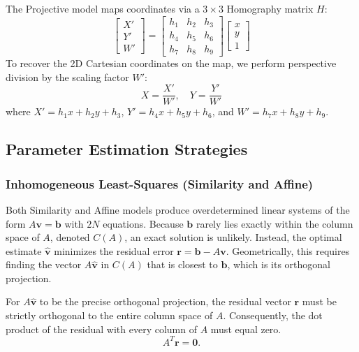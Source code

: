 The Projective model maps coordinates via a $3 \times 3$ Homography matrix $H$:
\begin{equation}
\begin{bmatrix} X' \\ Y' \\ W' \end{bmatrix} =
\begin{bmatrix}
h_1 & h_2 & h_3 \\
h_4 & h_5 & h_6 \\
h_7 & h_8 & h_9
\end{bmatrix}
\begin{bmatrix} x \\ y \\ 1 \end{bmatrix}
\end{equation}
To recover the 2D Cartesian coordinates on the map, we perform perspective division by the scaling factor $W'$:
\begin{equation}
X = \frac{X'}{W'}, \quad Y = \frac{Y'}{W'}
\end{equation}
where $X' = h_1x + h_2y + h_3$, $Y' = h_4x + h_5y + h_6$, and $W' = h_7x + h_8y + h_9$.


\subsection{Parameter Estimation Strategies}\label{subsec:parameter_estimation}

\subsubsection{Inhomogeneous Least-Squares (Similarity and Affine)}
Both Similarity and Affine models produce overdetermined linear systems of the form $A\mathbf{v}=\mathbf{b}$ with $2N$ equations. Because $\mathbf{b}$ rarely lies exactly within the column space of $A$, denoted $C(A)$, an exact solution is unlikely. Instead, the optimal estimate $\hat{\mathbf{v}}$ minimizes the residual error $\mathbf{r} = \mathbf{b} - A\mathbf{v}$. Geometrically, this requires finding the vector $A\hat{\mathbf{v}}$ in $C(A)$ that is closest to $\mathbf{b}$, which is its orthogonal projection.

For $A\hat{\mathbf{v}}$ to be the precise orthogonal projection, the residual vector $\mathbf{r}$ must be strictly orthogonal to the entire column space of $A$. Consequently, the dot product of the residual with every column of $A$ must equal zero.
\begin{equation}
A^T \mathbf{r} = \mathbf{0}.
\end{equation}

